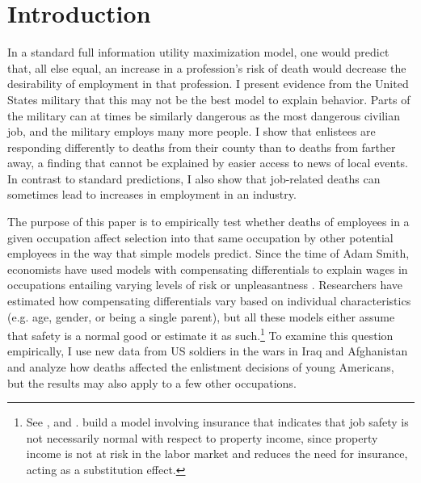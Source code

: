 \documentclass[12pt] {article}
\begin{document}
\section{Introduction\label{sec:Introduction}}
In a standard full information utility maximization model, one would predict that, all else equal, an increase in a profession's risk of death would decrease the desirability of employment in that profession. I present evidence from the United States military that this may not be the best model to explain behavior. Parts of the military can at times be similarly dangerous as the most dangerous civilian job, and the military employs many more people. I show that enlistees are responding differently to deaths from their county than to deaths from farther away, a finding that cannot be explained by easier access to news of local events. In contrast to standard predictions, I also show that job-related deaths can sometimes lead to increases in employment in an industry.

The purpose of this paper is to empirically test whether deaths of employees in a given occupation affect selection into that same occupation by other potential employees in the way that simple models predict. Since the time of Adam Smith, economists have used models with compensating differentials to explain wages in occupations entailing varying levels of risk or unpleasantness \citep{AdamSmith}. %
Researchers have estimated how compensating differentials vary based on individual characteristics (e.g. age, gender, or being a single parent), but all these models either assume that safety is a normal good or estimate it as such.\footnote{See \cite{DeLeireLevy2004}, \cite{BiddleZarkin} and \cite{garen1988compensating}. \cite{thaler1976value} build a model involving insurance that indicates that job safety is not necessarily normal with respect to property income, since property income is not at risk in the labor market and reduces the need for insurance, acting as a substitution effect.} To examine this question empirically, I use new data from US soldiers in the wars in Iraq and Afghanistan and analyze how deaths affected the enlistment decisions of young Americans, but the results may also apply to a few other occupations.
\end{document}

